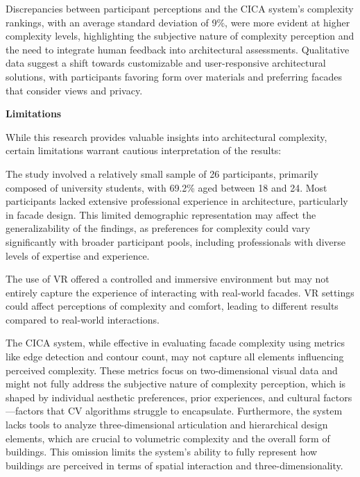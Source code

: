 Discrepancies between participant perceptions and the CICA system's complexity rankings, with an average standard deviation of 9\%,  were more evident at higher complexity levels, highlighting the subjective nature of complexity perception and the need to integrate human feedback into architectural assessments.
Qualitative data suggest a shift towards customizable and user-responsive architectural solutions, with participants favoring form over materials and preferring facades that consider views and privacy.

\textbf{Limitations}

While this research provides valuable insights into architectural complexity, certain limitations warrant cautious interpretation of the results:


The study involved a relatively small sample of 26 participants, primarily composed of university students, with 69.2\% aged between 18 and 24.
Most participants lacked extensive professional experience in architecture, particularly in facade design.
This limited demographic representation may affect the generalizability of the findings, as preferences for complexity could vary significantly with broader participant pools, including professionals with diverse levels of expertise and experience.

The use of VR offered a controlled and immersive environment but may not entirely capture the experience of interacting with real-world facades.
VR settings could affect perceptions of complexity and comfort, leading to different results compared to real-world interactions.

The CICA system, while effective in evaluating facade complexity using metrics like edge detection and contour count, may not capture all elements influencing perceived complexity.
These metrics focus on two-dimensional visual data and might not fully address the subjective nature of complexity perception, which is shaped by individual aesthetic preferences, prior experiences, and cultural factors—factors that CV algorithms struggle to encapsulate.
Furthermore, the system lacks tools to analyze three-dimensional articulation and hierarchical design elements, which are crucial to volumetric complexity and the overall form of buildings.
This omission limits the system's ability to fully represent how buildings are perceived in terms of spatial interaction and three-dimensionality.

